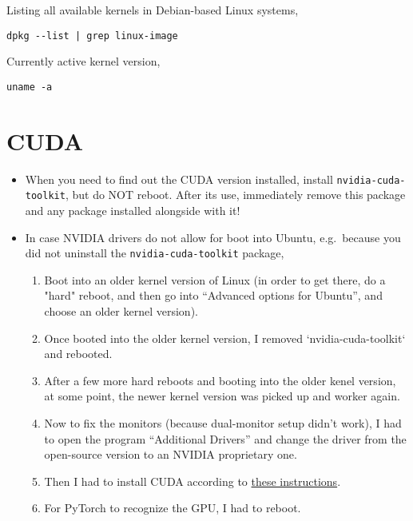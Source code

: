 \documentclass[12pt, a4paper]{scrbook}
\numberwithin{equation}{section}
\theoremstyle{definition}
\theoremstyle{definition}
\begin{document}
	Listing all available kernels in Debian-based Linux systems, 
	
	\begin{lstlisting}[style=mystylebash, label=alg:ubuntu_kernel, xleftmargin=\parindent]
		dpkg --list | grep linux-image
	\end{lstlisting}
	
	Currently active kernel version,
	
	\begin{lstlisting}[style=mystylebash, label=alg:ubuntu_kernel__current, xleftmargin=\parindent]
		uname -a
	\end{lstlisting}

	\section{CUDA}
	
	\begin{itemize}
		\item When you need to find out the CUDA version installed, install \texttt{nvidia-cuda-toolkit}, but do NOT reboot. After its use, immediately remove this package and any package installed alongside with it!
		
		\item In case NVIDIA drivers do not allow for boot into Ubuntu, e.g.~because you did not uninstall the \texttt{nvidia-cuda-toolkit} package,
		
		\begin{enumerate}
			\item Boot into an older kernel version of Linux (in order to get there, do a "hard" reboot, and then go into 
			\enquote{Advanced options for Ubuntu}, and choose an older kernel version). 
			\item Once booted into the older kernel version, I removed `nvidia-cuda-toolkit` and rebooted. 
			\item After a few more hard reboots and booting into the older kenel version, at some point, the newer kernel 
			version was picked up and worker again. 
			\item Now to fix the monitors (because dual-monitor setup didn't work), I had to open the program 
			\enquote{Additional Drivers} and change the driver from the open-source version to an NVIDIA proprietary one. 
			\item Then I had to install CUDA according to \href{https://docs.nvidia.com/cuda/cuda-installation-guide-linux/index.html}{these instructions}. 
			\item For PyTorch to recognize the GPU, I had to reboot. 
		\end{enumerate}
		
	\end{itemize}
	
\end{document}
